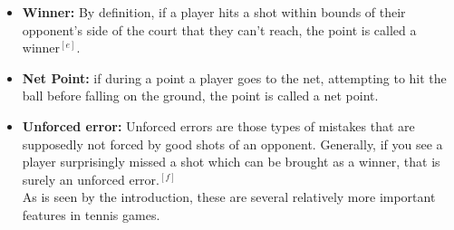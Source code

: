\documentclass[UTF8]{mcmthesis}
\begin{document}
\begin{itemize}
       \item \textbf{Winner:}
       By definition, if a player hits a shot within bounds of their opponent’s side of the court that they can’t reach, the point is called a winner$^{[e]}$.
       \item \textbf{Net Point:} 
       if during a point a player goes to the net, attempting to hit the ball before falling on the ground, the point is called a net point.
       \item \textbf{Unforced error: } 
       Unforced errors are those types of mistakes that are supposedly not forced by good shots of an opponent. Generally, if you see a player surprisingly missed a shot which can be brought as a winner, that is surely an unforced error.$^{[f]}$
       \\As is seen by the introduction, these are several relatively more important features in tennis games.
	\end{itemize}
\end{document}
